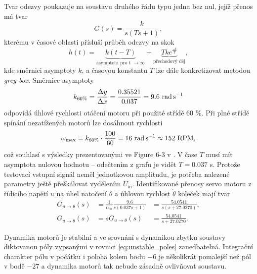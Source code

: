 \documentclass[conference]{IEEEtran}
\begin{document}
Tvar odezvy poukazuje na soustavu druhého řádu typu jedna bez nul, jejíž přenos má tvar
\begin{equation}
    G(s) = \frac{k}{s(Ts+1)},
    \label{eq:servo_prenos}
\end{equation}
kterému v časové oblasti přísluší průběh odezvy na skok
\begin{equation}
    h(t) = \underbrace{k(t-T)}_{\text{asymptota pro t $\to \infty$}} + \underbrace{Tk e^{\frac{-t}{T}}}_{\text{přechodový děj}},
    \label{eq:servo_odezva}
\end{equation}
kde směrnici asymptoty $k$, a časovou konstantu $T$ lze dále konkretizovat metodou \textit{grey box}.
Směrnice asymptoty
\begin{equation}
    k_{60\%} = \frac{\Delta y}{\Delta x} = \frac{0.35521}{0.037} = 9.6~\text{\si{\radian\per\second}}
\end{equation}
odpovídá úhlové rychlosti otáčení motoru při použité střídě $60$ \%. Při plné střídě spínání nezatížených motorů lze dosáhnout rychlosti
\begin{equation*}
    \omega_\text{max} = k_{60\%} \cdot \frac{100}{60} = 16~\text{\si{\radian\per\second}} \approx 152~\text{RPM},
\end{equation*}
což souhlasí s výsledky prezentovanými ve Figure 6-3 v \cite{model_based_design}.
V čase $T$ musí mít asymptota nulovou hodnotu -- odečtením z grafu je vidět $T = 0.037$ \si{\second}.
Protože testovací vstupní signál neměl jednotkovou amplitudu, je potřeba nalezené parametry ještě přeškálovat vydělením $U_\text{in}$. 
Identifikované přenosy servo motoru z řídicího napětí $u$ na úhel natočení $\theta$ a úhlovou rychlost $\dot{\theta}$ koleček mají tvar
\begin{equation}
    \begin{aligned}
        G_{u\to\theta}(s) &= \frac{1}{U_\text{in}} \frac{9.6}{s(0.037s + 1)}   &=  \frac{54.0541}{s(s+27.0270)}, \\
        G_{u\to\dot{\theta}}(s) &= sG_{u\to\theta}(s) &= \frac{54.0541}{s+27.0270}.
    \end{aligned}
\end{equation} 

Dynamika motorů je stabilní a ve srovnání s dynamikou zbytku soustavy diktovanou póly vypsanými v rovnici \eqref{eq:unstable_poles} zanedbatelná.
Integrační charakter pólu v počátku i poloha kolem bodu $-6$ je několikrát pomalejší než pól v bodě $-27$ a dynamika motorů tak nebude zásadně ovlivňovat soustavu.
\end{document}
